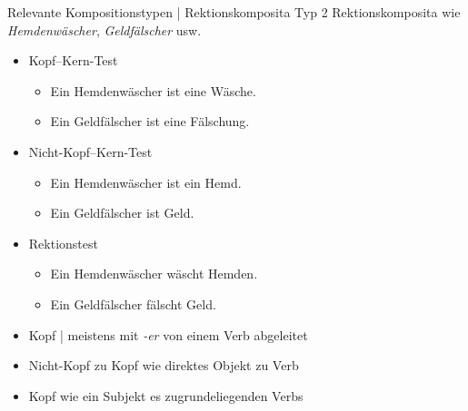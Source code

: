 \begin{frame}
  {Relevante Kompositionstypen | Rektionskomposita Typ 2}
  \onslide<+->
  Rektionskomposita wie \textit{Hemdenwäscher}, \textit{Geldfälscher} usw.
  \Halbzeile
  \begin{itemize}[<+->]
    \item Kopf--Kern-Test
      \begin{itemize}[<+->]
        \item Ein Hemdenwäscher ist eine Wäsche. \gruen{\Ck}
        \item Ein Geldfälscher ist eine Fälschung. \gruen{\Ck}
      \end{itemize}
    \item Nicht-Kopf--Kern-Test
      \begin{itemize}[<+->]
        \item Ein Hemdenwäscher ist ein Hemd. \rot{\Fl}
        \item Ein Geldfälscher ist Geld. \rot{\Fl}
      \end{itemize}
      \Halbzeile
    \item Rektionstest 
      \begin{itemize}[<+->]
        \item Ein Hemdenwäscher wäscht Hemden. \gruen{\Ck}
        \item Ein Geldfälscher fälscht Geld. \gruen{\Ck}
      \end{itemize}
      \Halbzeile
    \item Kopf | meistens mit \alert{\textit{-er}} von einem Verb abgeleitet
    \item Nicht-Kopf zu Kopf wie \alert{direktes Objekt} zu Verb
    \item Kopf wie ein \alert{Subjekt} es zugrundeliegenden Verbs
  \end{itemize}
\end{frame}

